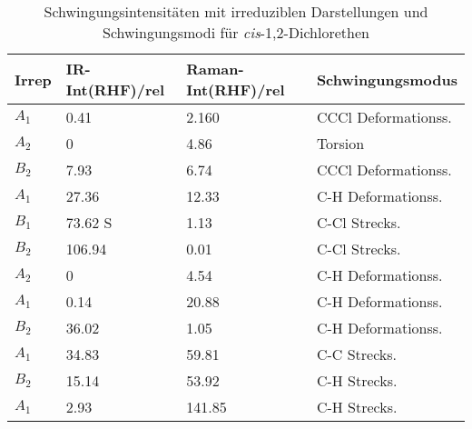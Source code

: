 \documentclass[12pt]{article}
\begin{document}
\begin{onehalfspace}
\begin{table}[!htpb]
\caption{Schwingungsintensitäten mit irreduziblen Darstellungen und Schwingungsmodi für
\textit{cis}-1,2-Dichlorethen}
\begin{tabular}{llll}
\midrule
Irrep & IR-Int(RHF)/rel & Raman-Int(RHF)/rel & Schwingungsmodus  \\
\midrule
$A _1$ & 0.41 & 2.160   & CCCl Deformationss.\\
$A _2$ & 0 & 4.86       & Torsion\\
$B _2$ & 7.93 & 6.74    &  CCCl Deformationss.\\
$A _1$ & 27.36 & 12.33  & C-H Deformationss.\\
$B _1$ & 73.62 S & 1.13   & C-Cl Strecks.\\
$B _2$ & 106.94 & 0.01  & C-Cl Strecks.\\
$A _2$ & 0 & 4.54       & C-H Deformationss.\\
$A _1$ & 0.14 & 20.88   & C-H Deformationss.\\
$B _2$ & 36.02 & 1.05   & C-H Deformationss.\\
$A _1$ & 34.83 & 59.81  & C-C Strecks.\\
$B _2$ & 15.14 & 53.92  & C-H Strecks.\\
$A _1$ & 2.93 & 141.85  & C-H Strecks.\\
\bottomrule
\end{tabular}
\label{tab:cisschwings}

\end{table}











\end{onehalfspace}
\end{document}
